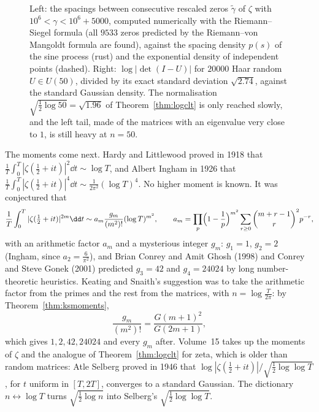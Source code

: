 \begin{figure}[ht]
\centering
{}
\caption{Left: the spacings between consecutive rescaled zeros $\tilde\gamma$ of $\zeta$ with $10^6<\gamma<10^6+5000$, computed numerically with the Riemann--Siegel formula (all $9533$ zeros predicted by the
Riemann--von Mangoldt formula are found), against the spacing density $p(s)$ of the sine process (rust) and the exponential density of independent points (dashed). Right: $\log|\det(I-U)|$ for $20000$ Haar random $U\in U(50)$, divided
by its exact standard deviation $\sqrt{2.74}$, against the standard Gaussian density. The normalisation $\sqrt{\frac12\log50}=\sqrt{1.96}$ of Theorem~\ref{thm:logclt} is only reached slowly, and the left tail, made of the matrices
with an eigenvalue very close to $1$, is still heavy at $n=50$.}
\label{fig:zeta}
\end{figure}

The moments come next. Hardy and Littlewood proved in 1918 that $\frac1T\int_0^T|\zeta(\frac12+it)|^2\dd t\sim\log T$, and Albert Ingham in 1926 that $\frac1T\int_0^T|\zeta(\frac12+it)|^4\dd t\sim\frac1{2\pi^2}(\log T)^4$. No higher moment is known. It was
conjectured that
\[
\frac1T\int_0^T|\zeta(\tfrac12+it)|^{2m}\dd t\sim a_m\frac{g_m}{(m^2)!}(\log T)^{m^2},\qquad a_m=\prod_p\Bigl(1-\frac1p\Bigr)^{m^2}\sum_{r\ge0}\binom{m+r-1}r^2p^{-r},
\]
with an arithmetic factor $a_m$ and a mysterious integer $g_m$: $g_1=1$, $g_2=2$ (Ingham, since $a_2=\frac6{\pi^2}$), and Brian Conrey and Amit Ghosh (1998) and Conrey and Steve Gonek (2001) predicted $g_3=42$ and
$g_4=24024$ by long number-theoretic heuristics. Keating and Snaith's suggestion was to take the arithmetic factor from the primes and the rest from the matrices, with $n=\log\frac T{2\pi}$: by Theorem~\ref{thm:ksmoments},
\[
\frac{g_m}{(m^2)!}=\frac{G(m+1)^2}{G(2m+1)},
\]
which gives $1,2,42,24024$ and every $g_m$ after. Volume~15 takes up the moments of $\zeta$ and the analogue of Theorem~\ref{thm:logclt} for zeta, which is older than random matrices: Atle Selberg proved in 1946 that
$\log|\zeta(\frac12+it)|/\sqrt{\frac12\log\log T}$, for $t$ uniform in $[T,2T]$, converges to a standard Gaussian. The dictionary $n\leftrightarrow\log T$ turns $\sqrt{\frac12\log n}$ into Selberg's $\sqrt{\frac12\log\log T}$.

